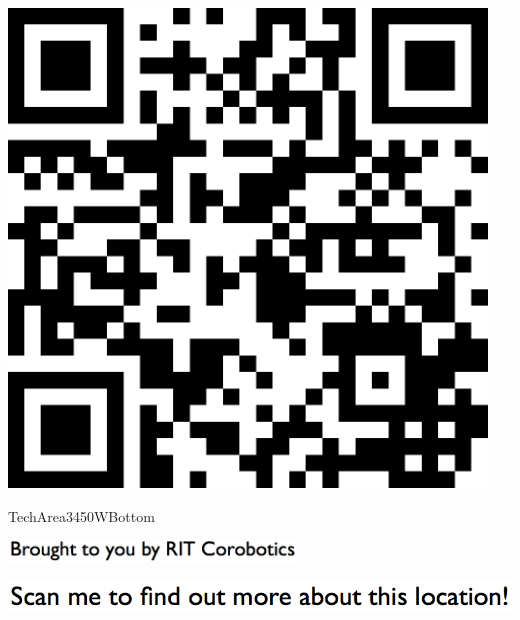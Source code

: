\documentclass[letterpaper]{article}
\begin{document}
 \begingroup 
 \centerline{\includegraphics[scale=1,width=5in,height=5in]{TechArea3450WBottom.png}} 
 \endgroup 
 \vspace*{\fill} 

 \hfill{\small TechArea3450WBottom} 

  \vspace{0.7in} 
 
 \centerline{\includegraphics[scale=1,width=3in]{text-bottom.png}} 
 
 \pagebreak 
{} 
 \vspace*{\fill} 
 
  \centerline{\includegraphics[scale=1,width=6in]{text-top.png}} 
 
 \vspace{0.5in} 
 
\end{document}
